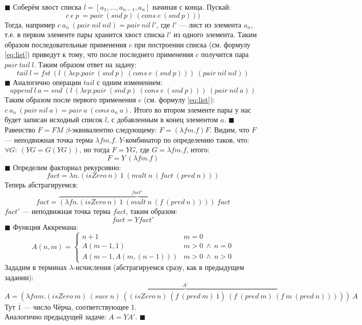\hfill $\blacksquare$
Соберём хвост списка $l = [a_1,\ldots,a_{n-1},a_n]$ начиная с конца. Пускай:
\[c\ e\ p\ = pair\ (snd\ p)\ (cons\ e\ (snd\ p)))\]
Тогда, например $c\ a_n\ (pair\ nil\ nil) = pair\ nil\ l'$, где $l'$ --- лист из элемента $a_n$, т.е. в первом элементе пары хранится хвост списка $l'$ из одного элемента. Таким образом последовательные применения $c$ при построении списка (см. формулу \ref{eq:list}) приведут к тому, что после последнего применения $c$ получится пара $pair\ tail\ l$. Таким образом ответ на задачу:
\[tail\ l = fst\ (l\ (\lambda ep.pair\ (snd\ p)\ (cons\ e\ (snd\ p)))\ (pair\ nil\ nil))\]
\hfill $\blacksquare$
Аналогично операции $tail$ с одним изменением:
\[append\ l\ a = snd\ (l\ (\lambda ep.pair\ (snd\ p)\ (cons\ e\ (snd\ p)))\ (pair\ nil\ a))\]
Таким образом после первого применения $c$ (см. формулу \ref{eq:list}): $c\ a_n\ (pair\ nil\ a) = pair\ a\ (cons\ a_n\ a)$. Итого во втором элементе пары у нас будет записан исходный список $l$, с добавленным в конец элементом $a$. \hfill $\blacksquare$
Равенство $F=FM$ $\beta$-эквивалентно следующему: $F=(\lambda fm.f)F$. Видим, что $F$ --- неподвижная точка терма $\lambda fm.f$.
$Y$-комбинатор по определению таков, что: $\forall G:\ (YG=G(YG))$, но тогда $F=YG$, где $G=\lambda fm.f$, итого:
\[
	F = Y\ (\lambda fm.f)
\]
\hfill $\blacksquare$
Определим факториал рекурсивно:
\[
	fact = \lambda n.(isZero\ n)\ 1\ (mult\ n\ (fact\ (pred\ n)))
\]
Теперь абстрагируемся:
\[
 	fact = \overbrace{(\lambda fn.(isZero\ n)\ 1\ (mult\ n\ (f\ (pred\ n))))}^{fact'}\ fact
\]
$fact'$ --- неподвижная точка терма $fact$, таким образом:
\[
	fact = Yfact'
\]
\hfill $\blacksquare$
Функция Аккремана:
\[
A(n, m) = 
\begin{cases}
n + 1 & m = 0 \\
A(m-1,1) & m > 0\ \land\ n = 0 \\
A(m-1,A(m,(n-1))) & m > 0\ \land\ n > 0
\end{cases}
\]
Зададим в терминах $\lambda$-исчисления (абстрагируемся сразу, как в предыдущем задании):
\[
A = \overbrace{(\lambda fnm.(isZero\ m)\ (succ\ n)\ ((isZero\ n)\ (f\ (pred\ m)\ \overline{1})\ (f\ (pred\ m)\ (f\ m\ (pred\ n)))))}^{A'}\ A
\]
Тут $\overline{1}$ --- число Чёрча, соответствующее 1.\\
Аналогично предыдущей задаче: $A = YA'$. \hfill $\blacksquare$

